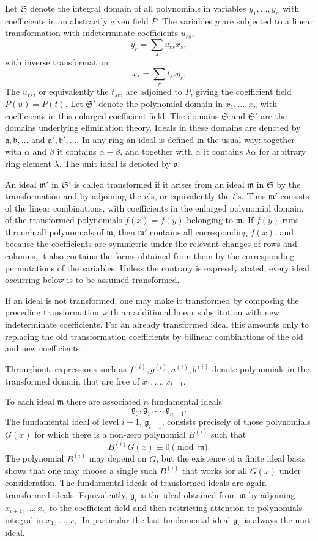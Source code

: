 \documentclass[12pt]{article}
\begin{document}
Let $\mathfrak S$ denote the integral domain of all polynomials in variables $y_1,\ldots,y_n$ with coefficients in an abstractly given field $P$. The variables $y$ are subjected to a linear transformation with indeterminate coefficients $u_{rs}$,
\[
  y_r=\sum_s u_{rs}x_s,
\]
with inverse transformation
\[
  x_s=\sum_r t_{sr}y_r.
\]
The $u_{rs}$, or equivalently the $t_{sr}$, are adjoined to $P$, giving the coefficient field $P(u)=P(t)$. Let $\mathfrak S'$ denote the polynomial domain in $x_1,\ldots,x_n$ with coefficients in this enlarged coefficient field. The domains $\mathfrak S$ and $\mathfrak S'$ are the domains underlying elimination theory. Ideals in these domains are denoted by $\mathfrak a,\mathfrak b,\ldots$ and $\mathfrak a',\mathfrak b',\ldots$. In any ring an ideal is defined in the usual way: together with $\alpha$ and $\beta$ it contains $\alpha-\beta$, and together with $\alpha$ it contains $\lambda\alpha$ for arbitrary ring element $\lambda$. The unit ideal is denoted by $\mathfrak o$.

An ideal $\mathfrak m'$ in $\mathfrak S'$ is called transformed if it arises from an ideal $\mathfrak m$ in $\mathfrak S$ by the transformation and by adjoining the $u$'s, or equivalently the $t$'s. Thus $\mathfrak m'$ consists of the linear combinations, with coefficients in the enlarged polynomial domain, of the transformed polynomials $f(x)=f(y)$ belonging to $\mathfrak m$. If $f(y)$ runs through all polynomials of $\mathfrak m$, then $\mathfrak m'$ contains all corresponding $f(x)$, and because the coefficients are symmetric under the relevant changes of rows and columns, it also contains the forms obtained from them by the corresponding permutations of the variables. Unless the contrary is expressly stated, every ideal occurring below is to be assumed transformed.

If an ideal is not transformed, one may make it transformed by composing the preceding transformation with an additional linear substitution with new indeterminate coefficients. For an already transformed ideal this amounts only to replacing the old transformation coefficients by bilinear combinations of the old and new coefficients.

Throughout, expressions such as $f^{(i)},g^{(i)},a^{(i)},b^{(i)}$ denote polynomials in the transformed domain that are free of $x_1,\ldots,x_{i-1}$.

To each ideal $\mathfrak m$ there are associated $n$ fundamental ideals
\[
  \mathfrak g_0,\mathfrak g_1,\ldots,\mathfrak g_{n-1}.
\]
The fundamental ideal of level $i-1$, $\mathfrak g_{i-1}$, consists precisely of those polynomials $G(x)$ for which there is a non-zero polynomial $B^{(i)}$ such that
\[
  B^{(i)}G(x)\equiv 0 \pmod{\mathfrak m}.
\]
The polynomial $B^{(i)}$ may depend on $G$, but the existence of a finite ideal basis shows that one may choose a single such $B^{(i)}$ that works for all $G(x)$ under consideration. The fundamental ideals of transformed ideals are again transformed ideals. Equivalently, $\mathfrak g_i$ is the ideal obtained from $\mathfrak m$ by adjoining $x_{i+1},\ldots,x_n$ to the coefficient field and then restricting attention to polynomials integral in $x_1,\ldots,x_i$. In particular the last fundamental ideal $\mathfrak g_n$ is always the unit ideal.
\end{document}
